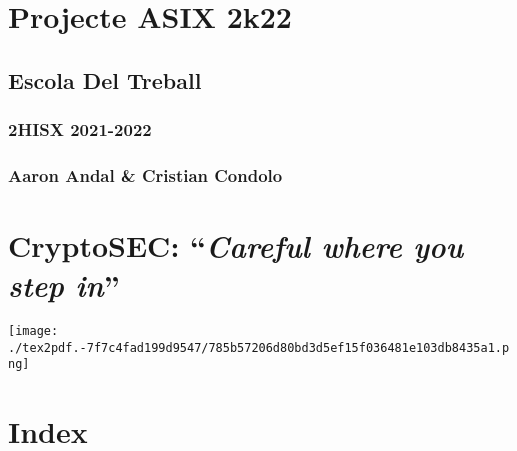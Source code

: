 \documentclass[]{article}
\date{}
\begin{document}
\hypertarget{projecte-asix-2k22}{%
\section{\texorpdfstring{\textbf{Projecte ASIX
2k22}}{Projecte ASIX 2k22}}\label{projecte-asix-2k22}}

\hypertarget{escola-del-treball}{%
\subsection{\texorpdfstring{\textbf{Escola Del
Treball}}{Escola Del Treball}}\label{escola-del-treball}}

\hypertarget{hisx-2021-2022}{%
\subsubsection{\texorpdfstring{\textbf{2HISX
2021-2022}}{2HISX 2021-2022}}\label{hisx-2021-2022}}

\hypertarget{aaron-andal-cristian-condolo}{%
\subsubsection{\texorpdfstring{\textbf{Aaron Andal \& Cristian
Condolo}}{Aaron Andal \& Cristian Condolo}}\label{aaron-andal-cristian-condolo}}

\hypertarget{cryptosec-careful-where-you-step-in}{%
\section{\texorpdfstring{\textbf{CryptoSEC}: ``\emph{Careful where you
step
in}''}{CryptoSEC: ``Careful where you step in''}}\label{cryptosec-careful-where-you-step-in}}

\texttt{[image: ./tex2pdf.-7f7c4fad199d9547/785b57206d80bd3d5ef15f036481e103db8435a1.png]}

\hypertarget{index}{%
\section{\texorpdfstring{\textbf{Index}}{Index}}\label{index}}
\end{document}
